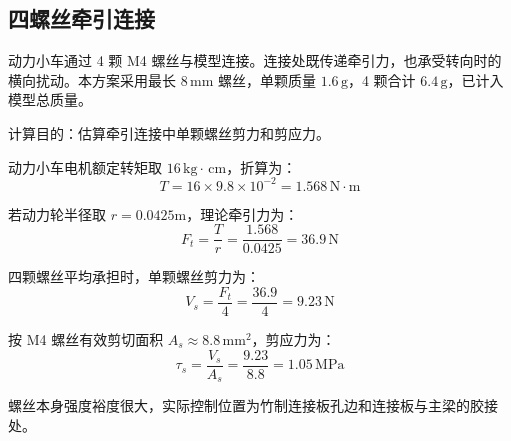 \documentclass[UTF8,a4paper,12pt,fontset=none]{ctexart}
\numberwithin{equation}{section}
\numberwithin{figure}{section}
\numberwithin{table}{section}
\newcommand{\mm}{\,\mathrm{mm}}
\newcommand{\g}{\,\mathrm{g}}
\newcommand{\kg}{\,\mathrm{kg}}
\newcommand{\cm}{\,\mathrm{cm}}
\newcommand{\Nunit}{\,\mathrm{N}}
\newcommand{\MPa}{\,\mathrm{MPa}}
\begin{document}
\subsection{四螺丝牵引连接}
动力小车通过 4 颗 M4 螺丝与模型连接。连接处既传递牵引力，也承受转向时的横向扰动。本方案采用最长 $8\mm$ 螺丝，单颗质量 $1.6\g$，4 颗合计 $6.4\g$，已计入模型总质量。

计算目的：估算牵引连接中单颗螺丝剪力和剪应力。

动力小车电机额定转矩取 $16\kg\cdot\cm$，折算为：
\begin{equation}
  T=16\times9.8\times10^{-2}=1.568\Nunit\cdot\mathrm{m}
\end{equation}

若动力轮半径取 $r=0.0425\mathrm{m}$，理论牵引力为：
\begin{equation}
  F_t=\frac{T}{r}=\frac{1.568}{0.0425}=36.9\Nunit
\end{equation}

四颗螺丝平均承担时，单颗螺丝剪力为：
\begin{equation}
  V_s=\frac{F_t}{4}=\frac{36.9}{4}=9.23\Nunit
\end{equation}

按 M4 螺丝有效剪切面积 $A_s\approx8.8\mm^2$，剪应力为：
\begin{equation}
  \tau_s=\frac{V_s}{A_s}=\frac{9.23}{8.8}=1.05\MPa
\end{equation}

螺丝本身强度裕度很大，实际控制位置为竹制连接板孔边和连接板与主梁的胶接处。
\end{document}
